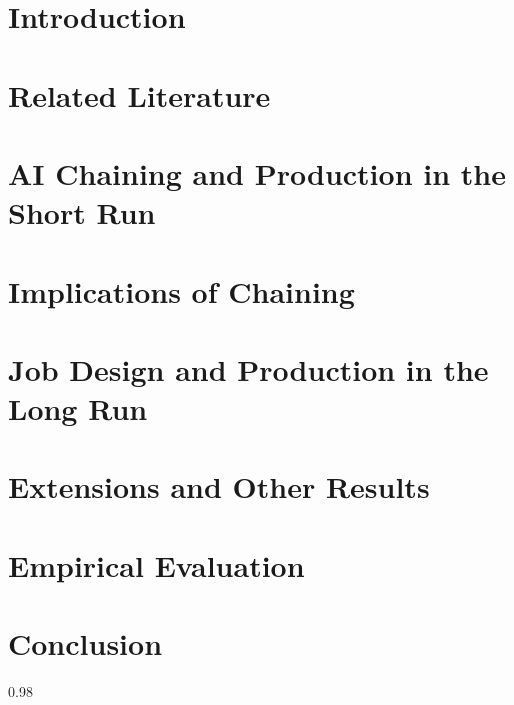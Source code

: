 \documentclass[12pt, final]{article}
\begin{document}
\setcounter{page}{1}

\section{Introduction}


\section{Related Literature}


\section{AI Chaining and Production in the Short Run} \label{sec:shortrun}


\section{Implications of Chaining} \label{sec:results}


\section{Job Design and Production in the Long Run} \label{sec:longrun}


\section{Extensions and Other Results} \label{sec:extensions}


\section{Empirical Evaluation} \label{sec:empirics}


\section{Conclusion}


\newpage
\clearpage


\setlength{\bibsep}{0.2ex}
\begin{spacing}{0.98}

\end{spacing}

\newpage
\appendix
\newpage
\end{document}
